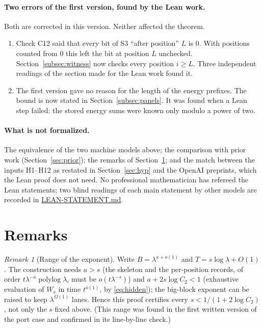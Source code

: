 \documentclass[11pt]{article}
\theoremstyle{definition}
\theoremstyle{remark}
\newtheorem{remark}[theorem]{Remark}
\newcommand{\src}[1]{\url{#1}}
\begin{document}
\paragraph{Two errors of the first version, found by the Lean work.} Both are corrected in this version. Neither affected the
theorem.
\begin{enumerate}
\item[(E1)] Check C12 said that every bit of S3 ``after position'' $L$ is $0$. With positions counted from $0$ this left the bit
  at position $L$ unchecked. Section~\ref{subsec:witness} now checks every position $i\ge L$. Three independent readings of the
  section made for the Lean work found it.
\item[(E2)] The first version gave no reason for the length of the energy prefixes. The bound is now stated in
  Section~\ref{subsec:panels}. It was found when a Lean step failed: the stored energy sums were known only modulo a power of two.
\end{enumerate}

\paragraph{What is not formalized.} The equivalence of the two machine models above; the comparison with prior work
(Section~\ref{sec:prior}); the remarks of Section~\ref{sec:remarks}; and the match between the inputs H1--H12 as restated in
Section~\ref{sec:hyp} and the OpenAI preprints, which the Lean proof does not need. No professional mathematician has refereed
the Lean statements; two blind readings of each main statement by other models are recorded in \src{LEAN-STATEMENT.md}.

\section{Remarks}\label{sec:remarks}

\begin{remark}[Range of the exponent]\label{rem:range}
Write $B=\lambda^{a+o(1)}$ and $T=s\log\lambda+O(1)$. The construction needs $a>s$ (the skeleton and the per-position records, of
order $t\lambda^{-a}\operatorname{polylog}\lambda$, must be $o(t\lambda^{-s})$) and $a+2s\log C_2<1$ (exhaustive evaluation of
$W_v$ in time $t^{o(1)}$, by \eqref{eq:hidden}); the big-block exponent can be raised to keep $\lambda^{\Omega(1)}$ lanes. Hence this
proof certifies every $s<1/(1+2\log C_2)$, not only the $s$ fixed above. (This range was found in the first written version of the port case and confirmed in its line-by-line check.)
\end{remark}
\end{document}
